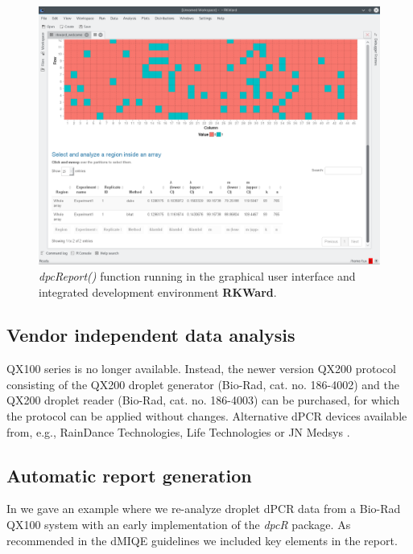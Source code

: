\documentclass[a4,center,fleqn]{NAR}
\begin{document}
\begin{figure}[t]
\begin{center}
\includegraphics[width=17cm]{GUI_RKWard_1.png}
\end{center}
\caption{\textit{dpcReport()} function running in the graphical user interface 
and integrated development environment \textbf{RKWard}.} 
\label{GUI_RKWard_1}
\end{figure}

\subsection{Vendor independent data analysis}

QX100 series is no longer available. Instead, the newer version QX200 protocol 
consisting of the QX200 droplet generator (Bio-Rad, cat. no. 186-4002) and the 
QX200 droplet reader (Bio-Rad, cat. no. 186-4003) can be purchased, for which 
the protocol can be applied without changes. Alternative dPCR devices available 
from, e.g., RainDance Technologies, Life Technologies or JN Medsys 
\citep{mock_digital_2016}.

\subsection{Automatic report generation}

In \cite{rodiger_r_2015} we gave an example where we re-analyze droplet dPCR 
data from a Bio-Rad QX100 system with an early implementation of the 
\textit{dpcR} package. As recommended in the dMIQE guidelines 
\cite{huggett_digital_2013} we included key elements in the report.
\end{document}

